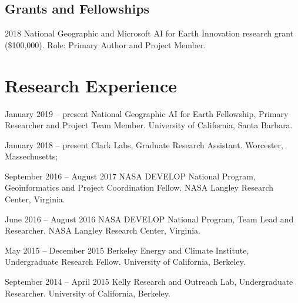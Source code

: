 \documentclass[12pt,letterpaper]{report}
\begin{document}
	\subsection*{Grants and Fellowships}
	
	\begin{tablist}
		
		\item[2018] \tab National Geographic and Microsoft AI for Earth Innovation research grant (\$100,000). Role: Primary Author and Project Member.
		
	\end{tablist}
	


        \section*{Research Experience}

        \begin{tablist}

                \item[January 2019 -- present] \tab National Geographic AI for Earth Fellowship, Primary Researcher and Project Team Member. University of California, Santa Barbara.

                \item[January 2018 -- present] \tab Clark Labs, Graduate Research Assistant. Worcester, Massechusetts; 

                \item[September 2016 -- August 2017] \tab NASA DEVELOP National Program, Geoinformatics and Project Coordination Fellow. NASA Langley Research Center, Virginia.

                \item[June 2016 -- August 2016] \tab NASA DEVELOP National Program, Team Lead and Researcher. NASA Langley Research Center, Virginia.

                \item[May 2015 -- December 2015] \tab Berkeley Energy and Climate Institute, Undergraduate Research Fellow. University of California, Berkeley.

                \item[September 2014 -- April 2015] \tab Kelly Research and Outreach Lab, Undergraduate Researcher. University of California, Berkeley.

        \end{tablist}

	
	
\end{document}
